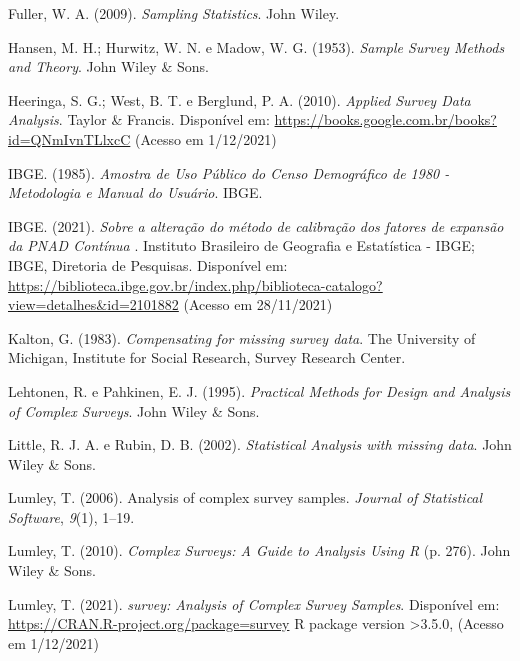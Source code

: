 \documentclass[
  12pt,
  brazilian,
]{book}
\newlength{\cslhangindent}
\newlength{\cslentryspacingunit} %
\newenvironment{CSLReferences}[2] %
 {%
  \setlength{\parindent}{0pt}
  \ifodd #1
  \let\oldpar\par
  \def\par{\hangindent=\cslhangindent\oldpar}
  \fi
  \setlength{\parskip}{#2\cslentryspacingunit}
 }%
 {}
\theoremstyle{definition}
\theoremstyle{definition}
\theoremstyle{definition}
\theoremstyle{definition}
\theoremstyle{remark}
\begin{document}
\begin{CSLReferences}{1}{0}
\leavevmode{}%
Fuller, W. A. (2009). \emph{Sampling Statistics}. John Wiley.

\leavevmode{}%
Hansen, M. H.; Hurwitz, W. N. e Madow, W. G. (1953). \emph{Sample Survey Methods and Theory}. John Wiley \& Sons.

\leavevmode{}%
Heeringa, S. G.; West, B. T. e Berglund, P. A. (2010). \emph{Applied Survey Data Analysis}. Taylor \& Francis. Disponível em: \url{https://books.google.com.br/books?id=QNmIvnTLlxcC} (Acesso em 1/12/2021)

\leavevmode{}%
IBGE. (1985). \emph{Amostra de {Uso} {Público} do {Censo} {Demográfico} de 1980 - {Metodologia} e {Manual} do {Usuário}}. IBGE.

\leavevmode{}%
IBGE. (2021). \emph{{Sobre a alteração do método de calibração dos fatores de expansão da PNAD Contínua }}. Instituto Brasileiro de Geografia e Estat{í}stica - IBGE; IBGE, Diretoria de Pesquisas. Disponível em: \url{https://biblioteca.ibge.gov.br/index.php/biblioteca-catalogo?view=detalhes\&id=2101882} (Acesso em 28/11/2021)

\leavevmode{}%
Kalton, G. (1983). \emph{Compensating for missing survey data}. The University of Michigan, Institute for Social Research, Survey Research Center.

\leavevmode{}%
Lehtonen, R. e Pahkinen, E. J. (1995). \emph{Practical Methods for Design and Analysis of Complex Surveys}. John Wiley \& Sons.

\leavevmode{}%
Little, R. J. A. e Rubin, D. B. (2002). \emph{Statistical Analysis with missing data}. John Wiley \& Sons.

\leavevmode{}%
Lumley, T. (2006). Analysis of complex survey samples. \emph{Journal of Statistical Software}, \emph{9}(1), 1--19.

\leavevmode{}%
Lumley, T. (2010). \emph{{Complex Surveys: A Guide to Analysis Using R}} (p. 276). John Wiley \& Sons.

\leavevmode{}%
Lumley, T. (2021). \emph{survey: Analysis of Complex Survey Samples}. Disponível em: \url{https://CRAN.R-project.org/package=survey} R package version \textgreater3.5.0, (Acesso em 1/12/2021)


\end{CSLReferences}
\end{document}
